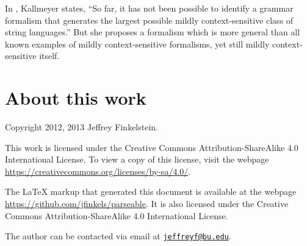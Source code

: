\documentclass{article}
\theoremstyle{remark} \newtheorem{technicality}{Technical note}
\theoremstyle{definition} \newtheorem{definition}{Definition}
\theoremstyle{definition} \newtheorem{openproblem}{Open problem}
\newcommand{\email}[1]{\href{mailto:#1}{\nolinkurl{#1}}} %
\begin{document}
In \cite{kallmeyer}, Kallmeyer states, ``So far, it has not been possible to identify a grammar formalism that generates the largest possible mildly context-sensitive class of string languages.''
But she proposes a formalism which is more general than all known examples of mildly context-sensitive formalisms, yet still mildly context-sensitive itself.

\section{About this work}

Copyright 2012, 2013 Jef{}frey Finkelstein.

This work is licensed under the Creative Commons Attribution-ShareAlike 4.0 International License.
To view a copy of this license, visit the webpage \mbox{\url{https://creativecommons.org/licenses/by-sa/4.0/}}.

The \LaTeX{} markup that generated this document is available at the webpage \mbox{\url{https://github.com/jfinkels/parseable}}.
It is also licensed under the Creative Commons Attribution-ShareAlike 4.0 International License.

The author can be contacted via email at \email{jeffreyf@bu.edu}.
\end{document}
